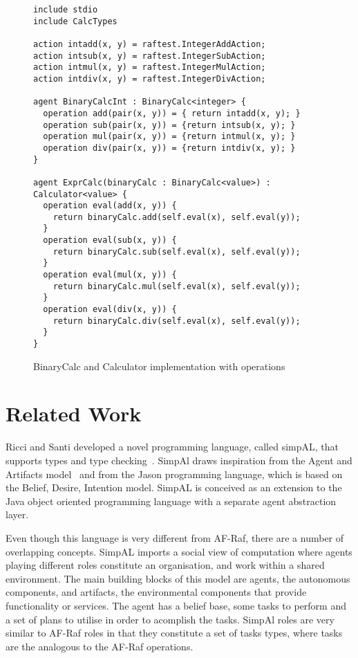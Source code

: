 \documentclass[a4paper,12pt,oneside,fleqn]{book} %
\begin{document}
\begin{figure}\footnotesize %
\begin{verbatim}
include stdio
include CalcTypes

action intadd(x, y) = raftest.IntegerAddAction;
action intsub(x, y) = raftest.IntegerSubAction;
action intmul(x, y) = raftest.IntegerMulAction;
action intdiv(x, y) = raftest.IntegerDivAction;

agent BinaryCalcInt : BinaryCalc<integer> {
  operation add(pair(x, y)) = { return intadd(x, y); }
  operation sub(pair(x, y)) = {return intsub(x, y); }
  operation mul(pair(x, y)) = {return intmul(x, y); }
  operation div(pair(x, y)) = {return intdiv(x, y); }
}

agent ExprCalc(binaryCalc : BinaryCalc<value>) : Calculator<value> {
  operation eval(add(x, y)) {
    return binaryCalc.add(self.eval(x), self.eval(y));
  }
  operation eval(sub(x, y)) {
    return binaryCalc.sub(self.eval(x), self.eval(y));
  }
  operation eval(mul(x, y)) {
    return binaryCalc.mul(self.eval(x), self.eval(y));
  }
  operation eval(div(x, y)) {
    return binaryCalc.div(self.eval(x), self.eval(y));
  }
}
\end{verbatim}
\caption{BinaryCalc and Calculator implementation with operations}
\label{fig:calc-op}
\end{figure} %


\section{Related Work}\label{ch:related} %


Ricci  and Santi developed a novel programming language, called simpAL, that
supports types and type checking~\cite{DBLP:conf/promas/RicciS12}. SimpAl
draws inspiration from the Agent and Artifacts
model~\cite{DBLP:conf/atal/RicciVO07} and from the Jason programming
language, which is based on the Belief, Desire, Intention model. SimpAL is
conceived as an extension to the Java object oriented programming language
with a separate agent abstraction layer.

Even though this language is very different from AF-Raf, there are a
number of overlapping concepts. SimpAL imports a social view of computation
where agents playing different roles constitute an organisation, and work
within a shared environment. The main building blocks of this model are
agents, the autonomous components, and artifacts, the environmental
components that provide functionality or services. The agent has a belief
base, some tasks to perform and a set of plans to utilise in order to
acomplish the tasks. SimpAl roles are very similar to AF-Raf roles in that
they constitute a set of tasks types, where tasks are the analogous to the
AF-Raf operations.
\end{document}
